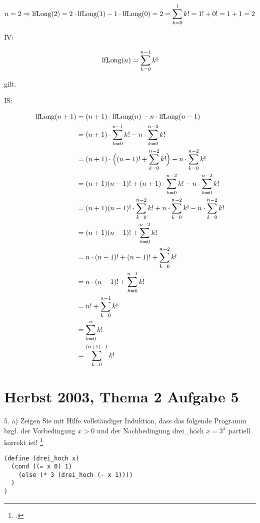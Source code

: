 \documentclass{lehramt-informatik}
\begin{document}
\begin{enumerate}
\begin{antwort}
\begin{displaymath}
n=2 \Rightarrow
\text{lfLong}(2) =
2 \cdot \text{lfLong}(1) - 1 \cdot \text{lfLong}(0) =
2 =
\sum^{1}_{k=0}k! =
1! + 0! =
1 + 1 =
2
\end{displaymath}

IV:

\begin{displaymath}
\text{lfLong}(n) = \sum^{n-1}_{k=0}k!
\end{displaymath}

gilt:

IS:

\begin{equation}
\begin{split}
\text{lfLong}(n+1) & = (n+1) \cdot \text{lfLong}(n) - n \cdot \text{lfLong}(n-1) \\
& = (n+1) \cdot \sum^{n-1}_{k=0}k! - n \cdot \sum^{n-2}_{k=0}k! \\
& = (n+1) \cdot \Big((n-1)! + \sum^{n-2}_{k=0}k!\Big) - n \cdot \sum^{n-2}_{k=0}k! \\
& = (n+1)(n-1)! + (n+1) \cdot \sum^{n-2}_{k=0}k! - n \cdot \sum^{n-2}_{k=0}k! \\
& = (n+1)(n-1)! \cdot \sum^{n-2}_{k=0}k! + n \cdot \sum^{n-2}_{k=0}k! - n \cdot \sum^{n-2}_{k=0}k! \\
& = (n+1)(n-1)! + \sum^{n-2}_{k=0}k! \\
& = n \cdot (n-1)! + (n-1)! + \sum^{n-2}_{k=0}k! \\
& = n \cdot (n-1)! + \sum^{n-1}_{k=0}k! \\
& = n! + \sum^{n-1}_{k=0}k! \\
& = \sum^{n}_{k=0}k! \\
& = \sum^{(n+1)-1}_{k=0}k!
\end{split}
\end{equation}
\end{antwort}
\end{enumerate}

%

\section{Herbst 2003, Thema 2 Aufgabe 5}

5. a) Zeigen Sie mit Hilfe vollständiger Induktion, dass das folgende
Programm bzgl. der Vorbedingung $x > 0$ und der Nachbedingung drei\_hoch
$x =  3^x$ partiell korrekt ist!
\footcite[Thema 2 Aufgabe 5]{examen:66112:2003:09}

\begin{verbatim}
(define (drei_hoch x)
  (cond ((= x 0) 1)
    (else (* 3 (drei_hoch (- x 1))))
  )
)
\end{verbatim}
\end{document}
